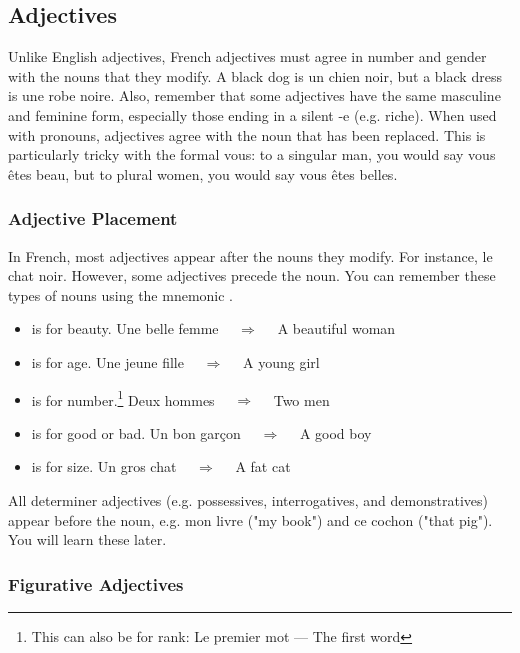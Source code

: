 \pagebreak
\subsection{Adjectives}

Unlike English adjectives, French adjectives must agree in number and gender with the nouns that they modify. A black dog is un chien noir, but a black dress is une robe noire. Also, remember that some adjectives have the same masculine and feminine form, especially those ending in a silent -e (e.g. riche).  When used with pronouns, adjectives agree with the noun that has been replaced. This is particularly tricky with the formal vous: to a singular man, you would say vous êtes beau, but to plural women, you would say vous êtes belles.

\subsubsection{Adjective Placement}

In French, most adjectives appear after the nouns they modify. For instance, le chat noir. However, some adjectives precede the noun. You can remember these types of nouns using the mnemonic .

\begin{itemize}
  \item  {} is for beauty. Une belle femme $\quad\Rightarrow\quad$ A beautiful woman
  \item  {} is for age. Une jeune fille $\quad\Rightarrow\quad$ A young girl
  \item  {} is for number.\footnote{This can also be for rank: Le premier mot — The first word} Deux hommes $\quad\Rightarrow\quad$ Two men
  \item  {} is for good or bad. Un bon garçon $\quad\Rightarrow\quad$ A good boy
  \item  {} is for size. Un gros chat $\quad\Rightarrow\quad$ A fat cat
\end{itemize}

All determiner adjectives (e.g. possessives, interrogatives, and demonstratives) appear before the noun, e.g. mon livre ("my book") and ce cochon ("that pig"). You will learn these later.

\subsubsection{Figurative Adjectives}

